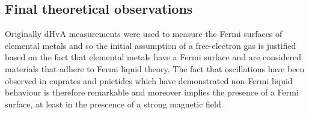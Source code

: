 \subsection{Final theoretical observations}

Originally \ac{dHvA} measurements were used to measure the Fermi surfaces of elemental metals and so the initial assumption of a free-electron gas is justified based on the fact that elemental metals have a Fermi surface and are considered materials that adhere to Fermi liquid theory. The fact that oscillations have been observed in cuprates and pnictides which have demonstrated non-Fermi liquid behaviour is therefore remarkable and moreover implies the presence of a Fermi surface, at least in the prescence of a strong magnetic field.

